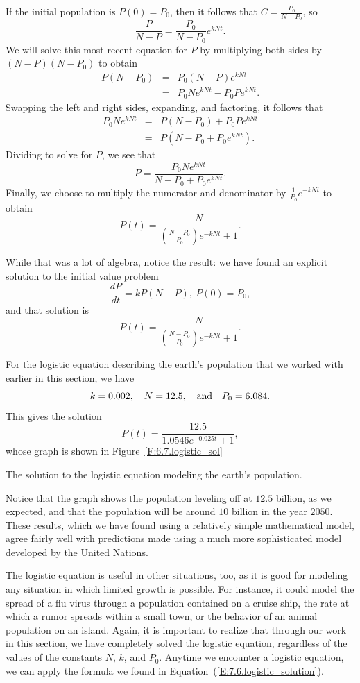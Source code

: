 If the initial population is $P(0) = P_0$, then it follows that $C = \frac{P_0}{N-P_0}$, so
$$\frac{P}{N-P} = \frac{P_0}{N-P_0}e^{kNt}.$$
We will solve this most recent equation for $P$ by multiplying both sides by
$(N-P)(N-P_0)$ to obtain 
\begin{eqnarray*}
P(N-P_0) &=& P_0(N-P)e^{kNt}  \\
	 &=& P_0Ne^{kNt} - P_0Pe^{kNt}. 
\end{eqnarray*}	 
Swapping the left and right sides, expanding, and factoring, it follows that
\begin{eqnarray*}
P_0Ne^{kNt} & = & P(N-P_0) + P_0 Pe^{kNt}  \\
	& = & P(N-P_0 + P_0e^{kNt}). 
\end{eqnarray*}
Dividing to solve for $P$, we see that
$$P = \frac{P_0Ne^{kNt}}{N-P_0 + P_0e^{kNt}}.$$
Finally, we choose to multiply the numerator and denominator by $\frac{1}{P_0}e^{-kNt}$
to obtain
$$
P(t) = \frac{N}{\left(\frac{N-P_0}{P_0}\right) e^{-kNt} + 1}.
$$

While that was a lot of algebra, notice the result:  we have
found an explicit solution to the initial value problem
$$
  \frac{dP}{dt} = kP(N-P), \ P(0) = P_0,
$$
and that solution is 
\begin{equation}\label{E:7.6.logistic_solution}
P(t) = \frac{N}{\left(\frac{N-P_0}{P_0}\right) e^{-kNt} + 1}.
\end{equation}

For the logistic equation describing the earth's population that we worked with earlier in this section, we have
$$k=0.002, \quad N= 12.5, \quad \hbox{and} \quad P_0 = 6.084.$$
This gives the solution
$$
P(t) = \frac{12.5}{1.0546e^{-0.025t} + 1},
$$
whose graph is shown in Figure~\ref{F:6.7.logistic_sol}
\begin{marginfigure} 
\caption{The solution to the logistic equation modeling the earth's population.} \label{F:6.7.logistic_sol}
\end{marginfigure}

Notice that the graph shows the population leveling off at $12.5$ billion, as
we expected, and that the population will be around $10$ billion in the
year $2050$.  These results, which we have found using a relatively simple
mathematical model, agree fairly well with predictions made using a
much more sophisticated model developed by the United Nations.

The logistic equation is useful in other situations, too, as it is good for modeling any situation in which limited growth is possible.  For instance, it could model the spread of a flu virus through a population contained on a cruise ship, the rate at which a rumor spreads within a small town, or the behavior of an animal population on an island.  Again, it is important to realize that through our work in this section, we have completely solved the logistic equation, regardless of the values of the constants $N$, $k$, and $P_0$.  Anytime we encounter a logistic equation, we can apply the formula we found in Equation~(\ref{E:7.6.logistic_solution}).


